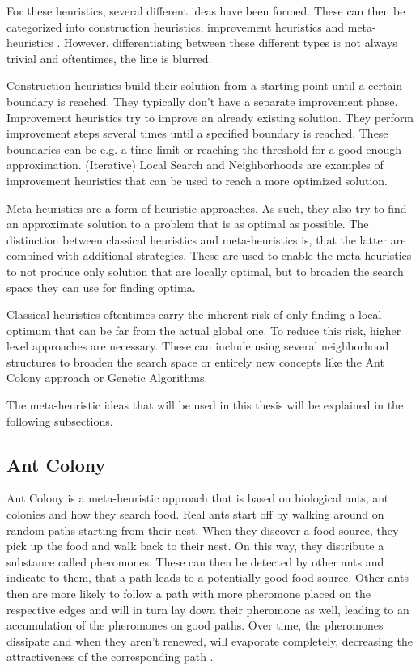 For these heuristics, several different ideas have been formed. 
These can then be categorized into construction heuristics, improvement heuristics and meta-heuristics \cite{laporte_5_2002,ropke_heuristic_2005}.
However, differentiating between these different types is not always trivial and oftentimes, the line is blurred.

Construction heuristics build their solution from a starting point until a certain boundary is reached. 
They typically don't have a separate improvement phase.
Improvement heuristics try to improve an already existing solution.
They perform improvement steps several times until a specified boundary is reached.
These boundaries can be e.g. a time limit or reaching the threshold for a good enough approximation.
(Iterative) Local Search and Neighborhoods are examples of improvement heuristics that can be used to reach a more optimized solution.

Meta-heuristics are a form of heuristic approaches.
As such, they also try to find an approximate solution to a problem that is as optimal as possible.
The distinction between classical heuristics and meta-heuristics is, that the latter are combined with additional strategies.
These are used to enable the meta-heuristics to not produce only solution that are locally optimal, but to broaden the search space they can use for finding optima.

Classical heuristics oftentimes carry the inherent risk of only finding a local optimum that can be far from the actual global one.
To reduce this risk, higher level approaches are necessary.
These can include using several neighborhood structures to broaden the search space or entirely new concepts like the Ant Colony approach or Genetic Algorithms. 

The meta-heuristic ideas that will be used in this thesis will be explained in the following subsections.



\subsection{Ant Colony}
\label{subsec:antColonyBackground}

Ant Colony is a meta-heuristic approach that is based on biological ants, ant colonies and how they search food.
Real ants start off by walking around on random paths starting from their nest. 
When they discover a food source, they pick up the food and walk back to their nest.
On this way, they distribute a substance called pheromones.
These can then be detected by other ants and indicate to them, that a path leads to a potentially good food source. 
Other ants then are more likely to follow a path with more pheromone placed on the respective edges and will in turn lay down their pheromone as well, leading to an accumulation of the pheromones on good paths.
Over time, the pheromones dissipate and when they aren't renewed, will evaporate completely, decreasing the attractiveness of the corresponding path \cite{gendreau_handbook_2010, dorigo_ant_1996}. 

